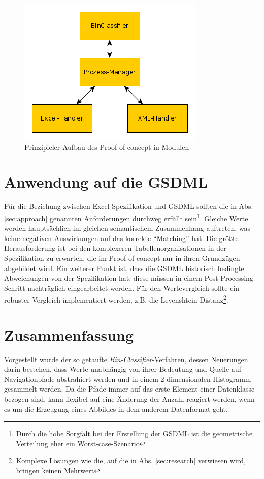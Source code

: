 \documentclass[a4paper,10pt]{article}
\begin{document}
\begin{figure}
 \centering
 \includegraphics[scale=0.3]{img/ProjektStruktur}
 \caption{Prinzipieler Aufbau des Proof-of-concept in Modulen}
 \label{project_structure}
\end{figure}

\section{Anwendung auf die GSDML}
Für die Beziehung zwischen Excel-Spezifikation und GSDML sollten die in Abs. \ref{sec:approach} genannten
Anforderungen durchweg erfüllt sein\footnote{Durch die hohe Sorgfalt bei der Erstellung der GSDML ist die geometrische
Verteilung eher ein Worst-case-Szenario}. Gleiche Werte werden hauptsächlich im gleichen semantischem Zusammenhang
auftreten, was keine negativen Auswirkungen auf das korrekte ``Matching'' hat. Die größte Herausforderung ist
bei den komplexeren Tabellenorganisationen in der Spezifikation zu erwarten, die im Proof-of-concept nur in
ihren Grundzügen abgebildet wird. Ein weiterer Punkt ist, dass die GSDML historisch bedingte Abweichungen von
der Spezifikation hat: diese müssen in einem Post-Processing-Schritt nachträglich eingearbeitet werden. Für den
Wertevergleich sollte ein robuster Vergleich implementiert werden, z.B. die Levenshtein-Distanz\footnote{Komplexe
Lösungen wie die, auf die in Abs. \ref{sec:research} verwiesen wird, bringen keinen Mehrwert}.

\section{Zusammenfassung}
Vorgestellt wurde der so getaufte \textit{Bin-Classifier}-Verfahren, dessen Neuerungen darin bestehen, dass Werte
unabhängig von ihrer Bedeutung und Quelle auf Navigationpfade abstrahiert werden und in einem
2-dimensionalen Histogramm gesammelt werden. Da die Pfade immer auf das erste Element einer Datenklasse bezogen sind,
kann flexibel auf eine Änderung der Anzahl reagiert werden, wenn es um die Erzeugung eines Abbildes in dem anderem
Datenformat geht.

\printbibliography
\end{document}
